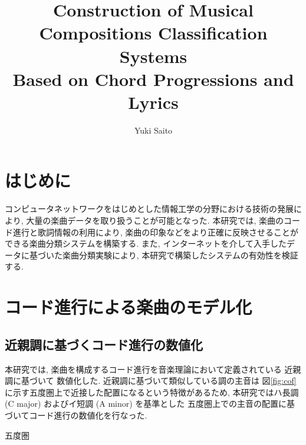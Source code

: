 \documentclass{jpreprint}
\title{
Construction of Musical Compositions Classification Systems \\
Based on Chord Progressions and Lyrics
}
\author{Yuki Saito}
\begin{document}
\maketitle

\begin{multicols}{2}
  
\section{はじめに}
コンピュータネットワークをはじめとした情報工学の分野における技術の発展により, 
大量の楽曲データを取り扱うことが可能となった.
本研究では, 楽曲のコード進行と歌詞情報の利用により,
楽曲の印象などをより正確に反映させることができる楽曲分類システムを構築する.
また,
インターネットを介して入手したデータに基づいた楽曲分類実験により,
本研究で構築したシステムの有効性を検証する.

\section{コード進行による楽曲のモデル化} 
\subsection{近親調に基づくコード進行の数値化}
本研究では, 
楽曲を構成するコード進行を音楽理論において定義されている
近親調\cite{NGSW07}に基づいて
数値化した.
近親調に基づいて類似している調の主音は
図\ref{fig:cof}に示す五度圏上で近接した配置になるという特徴があるため, 
本研究ではハ長調 (C major) およびイ短調 (A minor) を基準とした
五度圏上での主音の配置に基づいてコード進行の数値化を行なった.

\begin{figurehere}
  \centering
  \vspace{-0.5cm}
  \caption{五度圏}
  \label{fig:cof}
\end{figurehere}


\end{multicols}
\end{document}
